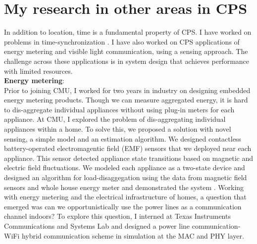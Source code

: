 \documentclass[10pt]{article}
\begin{document}
\section{My research in other areas in CPS}
In addition to location, time is a fundamental property of CPS. I have worked on problems in time-synchronization \cite{buevich2013hardware, dongare2017pulsar, rtas-alps-platform}.  I have also worked on CPS applications of energy metering and visible light communication, using a sensing approach. The challenge across these applications is in system design that achieves performance with limited resources. \\
\textbf{Energy metering}:\\
Prior to joining CMU, I worked for two years in industry on designing embedded energy metering products. %
Though we can measure aggregated energy, it is hard to dis-aggregate individual appliances without using plug-in meters for each appliance. At CMU, I explored the problem of dis-aggregating individual appliances within a home. 
To solve this, we proposed a solution with novel sensing, a simple model and an estimation algorithm. We designed contactless battery-operated electromagentic field (EMF) sensors that we deployed near each appliance. This sensor detected appliance state transitions based on magnetic and electric field fluctuations. We modeled each appliance as a two-state device and designed an algorithm for load-disaggegation using the data from magnetic field sensors and whole house energy meter \cite{rajagopal2013magnetic} and demonstrated the system \cite{rajagopal2013demo}. 
Working with energy metering and the electrical infrastructure of homes, a question that emerged was can we opportunistically use the power lines as a communication channel indoors? %
To explore this question, I interned at Texas Instruments Communications and Systems Lab and designed a power line communication-WiFi hybrid communication scheme in simulation at the MAC and PHY layer.\\
\end{document}
